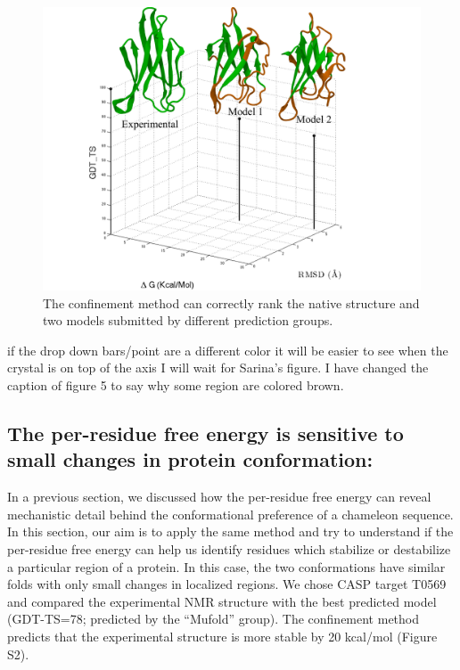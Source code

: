 \documentclass[12pt]{article}
\newcommand{\Alberto}[1]{\color{ForestGreen}#1\normalcolor }
\newcommand{\Arijit}[1]{\color{magenta}#1\normalcolor}
\begin{document}
\begin{figure}
    \begin{center}
        \includegraphics[width=3.5 in]{T0540.pdf}
    \end{center}
    \caption{The confinement method can correctly rank the native structure and two models submitted by different
        prediction groups.}
\label{fig:T0540}
\end{figure}
\Alberto{if the drop down bars/point are a different color it will be easier to see when the crystal
is on top of the axis}
\Arijit{I will wait for Sarina's figure. I have changed the caption of figure 5 to say why some region are colored brown.}

\subsection*{The per-residue free energy is sensitive to small changes in protein conformation:}

In a previous section, we discussed how the per-residue free energy can reveal mechanistic
detail behind the conformational preference of a chameleon sequence. In this section, our aim is to apply the same
method and try to understand if the per-residue free energy can help us identify residues which stabilize or destabilize
a particular region of a protein. In this case, the two conformations have similar folds with only small changes in
localized regions. We chose CASP target T0569 and compared the experimental NMR structure with the best predicted model
(GDT-TS=78; predicted by the ``Mufold'' group). The confinement method predicts that the experimental structure is more stable
by 20 kcal/mol (Figure S2).
\end{document}
